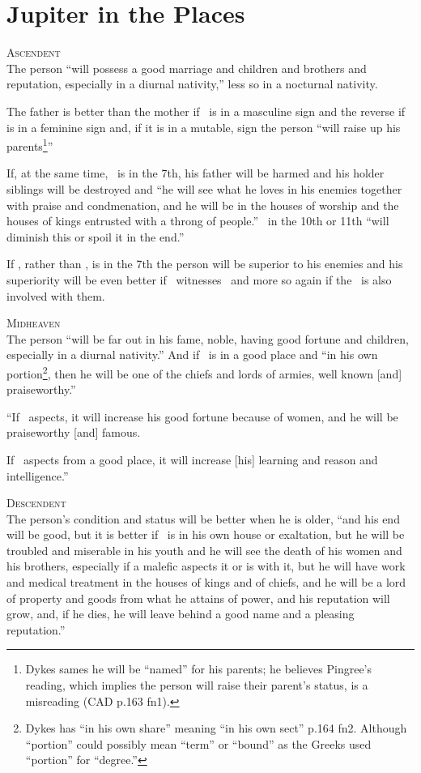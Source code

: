 \section{Jupiter in the Places}
\textsc{Ascendent} \hfill \\
\indent The person ``will possess a good marriage and children and brothers and reputation, especially in a diurnal nativity,'' less so in a nocturnal nativity.

The father is better than the mother if \Jupiter\, is in a masculine sign and the reverse if \Jupiter\, is in a feminine sign and, if it is in a mutable, sign the person ``will raise up his parents\footnote{Dykes sames he will be ``named'' for his parents; he believes Pingree's reading, which implies the person will raise their parent's status, is a misreading (CAD p.163 fn1).}''

If, at the same time, \Saturn\, is in the 7th, his father will be harmed and his holder siblings will be destroyed and ``he will see what he loves in his enemies together with praise and condmenation, and he will be in the houses of worship and the houses of kings entrusted with a throng of people.'' \Mars\, in the 10th or 11th ``will diminish this or spoil it in the end.''

If \Mars, rather than \Saturn, is in the 7th the person will be superior to his enemies and his superiority will be even better if \Venus\, witnesses \Jupiter\, and more so again if the \Moon\, is also involved with them.

\vspace{0.5em}
\noindent\textsc{Midheaven} \hfill \\
\indent The person ``will be far out in his fame, noble, having good fortune and children, especially in a diurnal nativity.'' And if \Mars\, is in a good place and ``in his own portion\footnote{Dykes has ``in his own share'' meaning ``in his own sect'' p.164 fn2. Although ``portion'' could possibly mean ``term'' or ``bound'' as the Greeks used ``portion'' for ``degree.''}, then he will be one of the chiefs and lords of armies, well known [and] praiseworthy.''

``If \Venus\, aspects, it will increase his good fortune because of women, and he will be praiseworthy [and] famous.

If \Mercury\, aspects from a good place, it will increase [his] learning and reason and intelligence.''

\vspace{0.5em}
\noindent\textsc{Descendent} \hfill \\
\indent The person's condition and status will be better when he is older, ``and his end will be good, but it is better if \Jupiter\, is in his own house or exaltation, but he will be troubled and miserable in his youth and he will see the death of his women and his brothers, especially if a malefic aspects it or is with it, but he will have work and medical treatment in the houses of kings and of chiefs, and he will be a lord of property and goods from what he attains of power, and his reputation will grow, and, if he dies, he will leave behind a good name and a pleasing reputation.''

